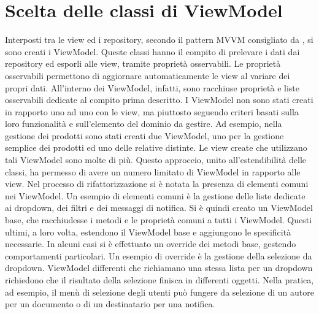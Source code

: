 \section{Scelta delle classi di ViewModel}
Interposti tra le view ed i repository, secondo il pattern \ac{MVVM} consigliato da \dotnet,
si sono creati i ViewModel.
Queste classi hanno il compito di prelevare i dati dai repository ed esporli alle view, tramite proprietà osservabili.
Le proprietà osservabili permettono di aggiornare automaticamente le view al variare dei propri dati.
All'interno dei ViewModel, infatti, sono racchiuse proprietà e liste osservabili dedicate al compito prima descritto.
I ViewModel non sono stati creati in rapporto uno ad uno con le view,
ma piuttosto seguendo criteri basati sulla loro funzionalità e sull'elemento del dominio da gestire.
Ad esempio, nella gestione dei prodotti sono stati creati due
ViewModel, uno per la gestione semplice dei prodotti ed uno delle relative distinte.
Le view create che utilizzano tali ViewModel sono molte di più.
Questo approccio, unito all'estendibilità delle classi, ha permesso di avere un numero limitato
di ViewModel in rapporto alle view.
Nel processo di rifattorizzazione si è notata la presenza di elementi comuni nei ViewModel.
Un esempio di elementi comuni è la gestione delle liste dedicate ai dropdown, dei filtri e dei messaggi di notifica.
Si è quindi creato un ViewModel base, che racchiudesse i metodi e le proprietà comuni a tutti i ViewModel.
Questi ultimi, a loro volta, estendono il ViewModel base e aggiungono le specificità necessarie.
In alcuni casi si è effettuato un override dei metodi base, gestendo comportamenti particolari.
Un esempio di override è la gestione della selezione da dropdown.
ViewModel differenti che richiamano una stessa lista per un dropdown richiedono che il risultato
della selezione finisca in differenti oggetti.
Nella pratica, ad esempio, il menù di selezione degli utenti può fungere
da selezione di un autore per un documento o di un destinatario per una notifica.